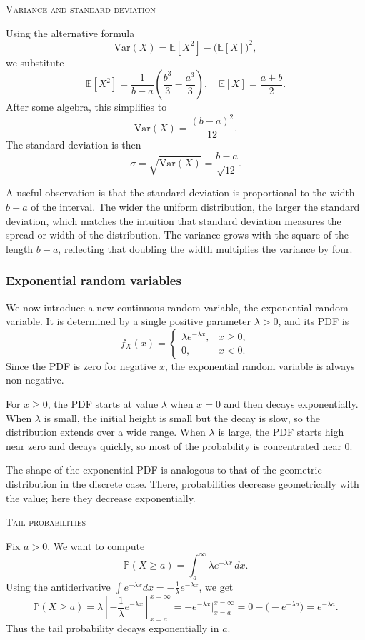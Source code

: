 \bigskip\textsc{Variance and standard deviation}

Using the alternative formula
\[
\mathrm{Var}(X) = \mathbb{E}[X^2] - \big(\mathbb{E}[X]\big)^2,
\]
we substitute
\[
\mathbb{E}[X^2] = \frac{1}{b-a}\left(\frac{b^3}{3} - \frac{a^3}{3}\right),
\quad
\mathbb{E}[X] = \frac{a+b}{2}.
\]
After some algebra, this simplifies to
\[
\mathrm{Var}(X) = \frac{(b-a)^2}{12}.
\]
The standard deviation is then
\[
\sigma = \sqrt{\mathrm{Var}(X)} = \frac{b-a}{\sqrt{12}}.
\]

A useful observation is that the standard deviation is proportional to the width \(b-a\) of the interval.  
The wider the uniform distribution, the larger the standard deviation, which matches the intuition that standard deviation measures the spread or width of the distribution.  
The variance grows with the square of the length \(b-a\), reflecting that doubling the width multiplies the variance by four.


\subsubsection{Exponential random variables}

We now introduce a new continuous random variable, the exponential random variable.  
It is determined by a single positive parameter \(\lambda > 0\), and its PDF is
\[
f_X(x) =
\begin{cases}
\lambda e^{-\lambda x}, & x \ge 0, \\
0, & x < 0.
\end{cases}
\]
Since the PDF is zero for negative \(x\), the exponential random variable is always non-negative.

For \(x \ge 0\), the PDF starts at value \(\lambda\) when \(x = 0\) and then decays exponentially.  
When \(\lambda\) is small, the initial height is small but the decay is slow, so the distribution extends over a wide range.  
When \(\lambda\) is large, the PDF starts high near zero and decays quickly, so most of the probability is concentrated near \(0\).

The shape of the exponential PDF is analogous to that of the geometric distribution in the discrete case.  
There, probabilities decrease geometrically with the value; here they decrease exponentially.

\bigskip\textsc{Tail probabilities}

Fix \(a > 0\).  
We want to compute
\[
\mathbb{P}(X \ge a) = \int_a^{\infty} \lambda e^{-\lambda x} \, dx.
\]
Using the antiderivative \(\int e^{-\lambda x} dx = -\frac{1}{\lambda} e^{-\lambda x}\), we get
\[
\mathbb{P}(X \ge a)
= \lambda \left[-\frac{1}{\lambda} e^{-\lambda x}\right]_{x=a}^{x=\infty}
= - e^{-\lambda x}\Big|_{x=a}^{x=\infty}
= 0 - \big(-e^{-\lambda a}\big)
= e^{-\lambda a}.
\]
Thus the tail probability decays exponentially in \(a\).  

